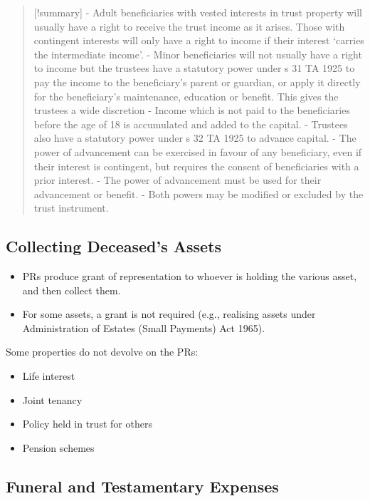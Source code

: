 \documentclass[
]{article}
\providecommand{\tightlist}{%
  \setlength{\itemsep}{0pt}\setlength{\parskip}{0pt}}
\begin{document}
\begin{quote}
{[}!summary{]} - Adult beneficiaries with vested interests in trust
property will usually have a right to receive the trust income as it
arises. Those with contingent interests will only have a right to income
if their interest `carries the intermediate income'. - Minor
beneficiaries will not usually have a right to income but the trustees
have a statutory power under s 31 TA 1925 to pay the income to the
beneficiary's parent or guardian, or apply it directly for the
beneficiary's maintenance, education or benefit. This gives the trustees
a wide discretion - Income which is not paid to the beneficiaries before
the age of 18 is accumulated and added to the capital. - Trustees also
have a statutory power under s 32 TA 1925 to advance capital. - The
power of advancement can be exercised in favour of any beneficiary, even
if their interest is contingent, but requires the consent of
beneficiaries with a prior interest. - The power of advancement must be
used for their advancement or benefit. - Both powers may be modified or
excluded by the trust instrument.
\end{quote}

\hypertarget{collecting-deceaseds-assets}{%
\subsection{Collecting Deceased's
Assets}\label{collecting-deceaseds-assets}}

\begin{itemize}
\tightlist
\item
  PRs produce grant of representation to whoever is holding the various
  asset, and then collect them.
\item
  For some assets, a grant is not required (e.g., realising assets under
  Administration of Estates (Small Payments) Act 1965).
\end{itemize}

Some properties do not devolve on the PRs:

\begin{itemize}
\tightlist
\item
  Life interest
\item
  Joint tenancy
\item
  Policy held in trust for others
\item
  Pension schemes
\end{itemize}

\hypertarget{funeral-and-testamentary-expenses}{%
\subsection{Funeral and Testamentary
Expenses}\label{funeral-and-testamentary-expenses}}
\end{document}
